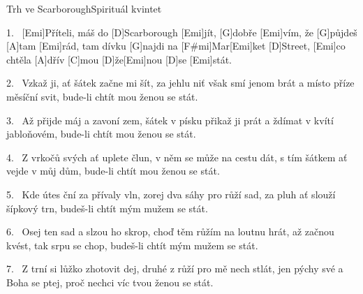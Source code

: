 \begin{song}{Trh ve Scarborough}{Spirituál kvintet}

\begin{xverse}{1.~}
[\large Emi]Příteli, máš do [\large D]Scarborough [\large Emi]jít,
[\large G]dobře [\large Emi]vím, že [\large G]půjdeš [\large A]tam [\large Emi]rád,
tam dívku [\large G]najdi na [\large F#mi]Mar[\large Emi]ket [\large D]Street,
[\large Emi]co chtěla [\large A]dřív [\large C]mou [\large D]{že}[\large Emi]nou [\large D]se [\large Emi]stát.
\end{xverse}

\begin{xverse}{2.~}
Vzkaž ji, ať šátek začne mi šít,
za jehlu niť však smí jenom brát
a místo příze měsíční svit,
bude-li chtít mou ženou se stát.
\end{xverse}

\begin{xverse}{3.~}
Až přijde máj a zavoní zem,
šátek v písku přikaž ji prát
a ždímat v kvítí jabloňovém,
bude-li chtít mou ženou se stát.
\end{xverse}

\begin{xverse}{4.~}
Z vrkočů svých ať uplete člun,
v něm se může na cestu dát,
s tím šátkem ať vejde v můj dům,
bude-li chtít mou ženou se stát.
\end{xverse}

\begin{xverse}{5.~}
Kde útes ční za přívaly vln,
zorej dva sáhy pro růží sad,
za pluh ať slouží šípkový trn,
budeš-li chtít mým mužem se stát.
\end{xverse}

\begin{xverse}{6.~}
Osej ten sad a slzou ho skrop,
choď těm růžím na loutnu hrát,
až začnou kvést, tak srpu se chop,
budeš-li chtít mým mužem se stát.
\end{xverse}

\begin{xverse}{7.~}
Z trní si lůžko zhotovit dej,
druhé z růží pro mě nech stlát,
jen pýchy své a Boha se ptej,
proč nechci víc tvou ženou se stát.
\end{xverse}

\end{song}

